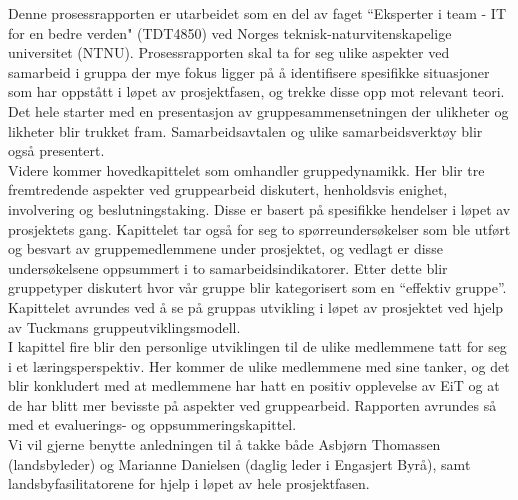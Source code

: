 

Denne prosessrapporten er utarbeidet som en del av faget ``Eksperter i team - IT for en bedre verden" (TDT4850) ved Norges teknisk-naturvitenskapelige universitet (NTNU). Prosessrapporten skal ta for seg ulike aspekter ved samarbeid i gruppa der mye fokus ligger på å identifisere spesifikke situasjoner som har oppstått i løpet av prosjektfasen, og trekke disse opp mot relevant teori. Det hele starter med en presentasjon av gruppesammensetningen der ulikheter og likheter blir trukket fram. Samarbeidsavtalen og ulike samarbeidsverktøy blir også presentert.\\

Videre kommer hovedkapittelet som omhandler gruppedynamikk. Her blir tre fremtredende aspekter ved gruppearbeid diskutert, henholdsvis enighet, involvering og beslutningstaking. Disse er basert på spesifikke hendelser i løpet av prosjektets gang. Kapittelet tar også for seg to spørreundersøkelser som ble utført og besvart av gruppemedlemmene under prosjektet, og vedlagt er disse undersøkelsene oppsummert i to samarbeidsindikatorer. Etter dette blir gruppetyper diskutert hvor vår gruppe blir kategorisert som en “effektiv gruppe”. Kapittelet avrundes ved å se på gruppas utvikling i løpet av prosjektet ved hjelp av Tuckmans gruppeutviklingsmodell.\\

I kapittel fire blir den personlige utviklingen til de ulike medlemmene tatt for seg i et læringsperspektiv. Her kommer de ulike medlemmene med sine tanker, og det blir konkludert med at medlemmene har hatt en positiv opplevelse av EiT og at de har blitt mer bevisste på aspekter ved gruppearbeid. Rapporten avrundes så med et evaluerings- og oppsummeringskapittel.\\

Vi vil gjerne benytte anledningen til å takke både Asbjørn Thomassen (landsbyleder) og Marianne Danielsen (daglig leder i Engasjert Byrå), samt landsbyfasilitatorene for hjelp i løpet av hele prosjektfasen.
